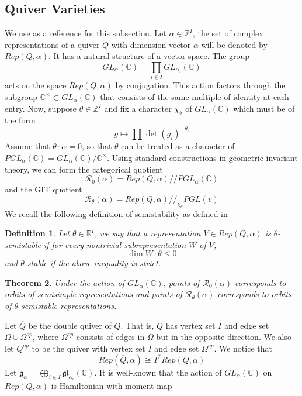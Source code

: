 \documentclass[12pt]{amsart}
\theoremstyle{plain}
\newtheorem{thm}{Theorem}[section]
\newtheorem{defn}[thm]{Definition}
\theoremstyle{definition}
\theoremstyle{remark}
\begin{document}
\subsection{Quiver Varieties}
We use \cite{kirillov2016quiver} as a reference for this subsection.
Let $\alpha\in\mathbb Z^I$, the set of complex representations of a quiver $Q$ with dimension vector $\alpha$ will be denoted by $Rep(Q,\alpha)$. It has a natural structure of a vector space. The group 
$$GL_{\alpha}(\mathbb C)=\prod_{i\in I}GL_{\alpha_i}(\mathbb C)$$
acts on the space $Rep(Q,\alpha)$ by conjugation. This action factors through the subgroup $\mathbb C^{\times}\subset GL_{\alpha}(\mathbb C)$ that consists of the same multiple of identity at each entry. Now, suppose $\theta\in\mathbb Z^{I}$ and fix a character $\chi_{\theta}$ of $GL_{\alpha}(\mathbb C)$ which must be of the form 
$$g\mapsto \prod\det(g_i)^{-\theta_i}$$
Assume that $\theta\cdot\alpha=0$, so that $\theta$ can be treated as a character of $PGL_{\alpha}(\mathbb C)=GL_{\alpha}(\mathbb C)/\mathbb C^{\times}$. Using standard constructions in  geometric invariant theory, we can form the categorical quotient
$$\mathcal{R}_0(\alpha)=Rep(Q,\alpha)/\!/PGL_{\alpha}(\mathbb C)$$
and the GIT quotient
$$\mathcal{R}_{\theta}(\alpha)=Rep(Q,\alpha)/\!/_{\chi_{\theta}}PGL(v)$$
We recall the following definition of semistability as defined in \cite{king1994moduli}
\begin{defn}
    Let $\theta\in\mathbb R^{I}$, we say that a representation $V\in Rep(Q,\alpha)$ is $\theta$-semistable if for every nontrivial subrepresentation $W$ of $V$, 
    $$\dim W\cdot \theta\leq 0$$
    and $\theta$-stable if the above inequality is strict.
\end{defn}
\begin{thm}
    \cite{king1994moduli} Under the action of $GL_{\alpha}(\mathbb C)$, points of $\mathcal{R}_0(\alpha)$ corresponds to orbits of semisimple representations and points of $\mathcal{R}_{\theta}(\alpha)$ corresponds to orbits of $\theta$-semistable representations.
\end{thm}
\hspace{-12pt}Let $\overline{Q}$ be the double quiver of $Q$. That is, $Q$ has vertex set $I$ and edge set $\Omega\cup \Omega^{op}$, where $\Omega^{op}$ consists of edges in $\Omega$ but in the opposite direction. We also let $Q^{op}$ to be the quiver with vertex set $I$ and edge set $\Omega^{op}$. We notice that 
$$Rep(\overline{Q},\alpha)\cong T^*Rep(Q,\alpha)$$
Let $\displaystyle \mathfrak{g}_{\alpha}=\bigoplus_{i\in I}\mathfrak{gl}_{\alpha_i}(\mathbb C)$. It is well-known that the action of $GL_{\alpha}(\mathbb C)$ on $Rep(Q,\alpha)$ is Hamiltonian with moment map 
\end{document}
